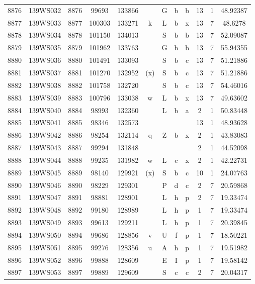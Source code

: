 \begin{tabular}{|*{12}{c|}}
8876 & 139WS032 & 8876 & 99693 & 133866 &  & G & b & b & 13 & 1 & 48.92387 \\ 
8877 & 139WS033 & 8877 & 100303 & 133271 & k & L & b & x & 13 & 7 & 48.6278 \\ 
8878 & 139WS034 & 8878 & 101150 & 134013 &  & S & b & b & 13 & 7 & 52.09087 \\ 
8879 & 139WS035 & 8879 & 101962 & 133763 &  & G & b & b & 13 & 7 & 55.94355 \\ 
8880 & 139WS036 & 8880 & 101491 & 133093 &  & S & b & c & 13 & 7 & 51.21886 \\ 
8881 & 139WS037 & 8881 & 101270 & 132952 & (x) & S & b & c & 13 & 7 & 51.21886 \\ 
8882 & 139WS038 & 8882 & 101758 & 132720 &  & S & b & c & 13 & 7 & 54.46016 \\ 
8883 & 139WS039 & 8883 & 100796 & 133038 & w & L & b & x & 13 & 7 & 49.63602 \\ 
8884 & 139WS040 & 8884 & 98993 & 132360 &  & L & b & a & 2 & 1 & 50.83448 \\ 
8885 & 139WS041 & 8885 & 98346 & 132573 &  &  &  &  & 13 & 1 & 48.93628 \\ 
8886 & 139WS042 & 8886 & 98254 & 132114 & q & Z & b & x & 2 & 1 & 43.83083 \\ 
8887 & 139WS043 & 8887 & 99294 & 131848 &  &  &  &  & 2 & 1 & 44.52098 \\ 
8888 & 139WS044 & 8888 & 99235 & 131982 & w & L & c & x & 2 & 1 & 42.22731 \\ 
8889 & 139WS045 & 8889 & 98140 & 129921 & (x) & S & b & c & 10 & 1 & 24.07763 \\ 
8890 & 139WS046 & 8890 & 98229 & 129301 &  & P & d & c & 2 & 7 & 20.59868 \\ 
8891 & 139WS047 & 8891 & 98881 & 128901 &  & L & h & p & 2 & 7 & 19.33474 \\ 
8892 & 139WS048 & 8892 & 99180 & 128989 &  & L & h & p & 1 & 7 & 19.33474 \\ 
8893 & 139WS049 & 8893 & 99613 & 129211 &  & L & h & p & 1 & 7 & 20.39845 \\ 
8894 & 139WS050 & 8894 & 99686 & 128856 & v & U & f & p & 1 & 7 & 18.50221 \\ 
8895 & 139WS051 & 8895 & 99276 & 128356 & u & A & h & p & 1 & 7 & 19.51982 \\ 
8896 & 139WS052 & 8896 & 99888 & 128609 &  & E & I & p & 1 & 7 & 19.58142 \\ 
8897 & 139WS053 & 8897 & 99889 & 129609 &  & S & c & c & 2 & 7 & 20.04317 \\ 

\end{tabular}
